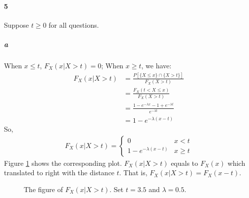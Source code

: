 \documentclass[22pt]{article}
\begin{document}
		\paragraph{5}Suppose $t\geq	0$ for all questions.
			\subparagraph{a}  When $x \leq t$, $F_X(x|X>t) =0$; When $x \geq t$, we have:
			\begin{align}
				F_X(x|X>t) &= \frac{P[\{X\leq x\}\cap\{X >t\}]}{F_X(X>t)}\\
				& = \frac{F_X(t<X\leq x)}{F_X(X>t)} \\
				& = \frac{1-e^{-\lambda x}-1+e^{-\lambda t}}{e^{-\lambda t}}\\
				& = 1 - e^{-\lambda(x-t)}
			\end{align}
			So, \begin{align} 
				 F_X(x|X>t) = 
				\begin{cases}
				0 & x< t\\
				1 - e^{-\lambda(x-t)} & x\geq t
				\end{cases}
		\end{align}
		Figure \ref{5a} shows the corresponding plot. $F_X(x|X>t)$ equals to $F_X(x)$ which translated to right with the distance $t$. That is, $F_X(x|X>t) = F_X(x-t)$.
		\begin{figure}[H]
				\centering
				\caption{The figure of $F_X(x|X>t)$. Set $t = 3.5$ and $\lambda = 0.5$. } 
				\label{5a}
			\end{figure}
\end{document}
